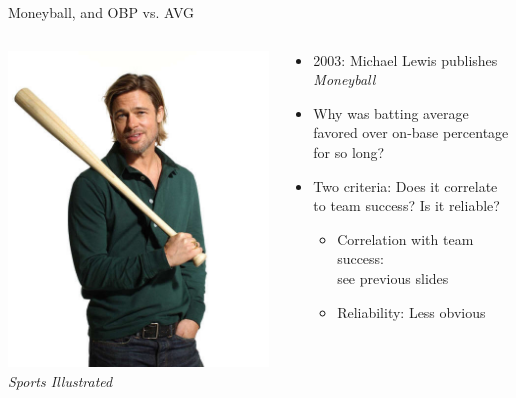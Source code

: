 \documentclass[handout]{beamer}
\begin{document}
\begin{frame}{Moneyball, and OBP vs. AVG}
  \begin{columns}
    \begin{column}{0.3\textwidth}
      \centering
      \includegraphics[width = \textwidth]{images/brad_pitt.jpg}\\
      \tiny \color{ricegray} \it Sports Illustrated
    \end{column}
    \begin{column}{0.7\textwidth}
      \begin{itemize}
        \item 2003: Michael Lewis publishes {\it Moneyball}
        \item Why was batting average favored over on-base percentage for so long?
        \item Two criteria: Does it correlate to team success? Is it reliable?
        \begin{itemize}
          \item Correlation with team success:\\ see previous slides
          \item Reliability: Less obvious
        \end{itemize}
      \end{itemize}
    \end{column}
  \end{columns}
\end{frame}
\end{document}
